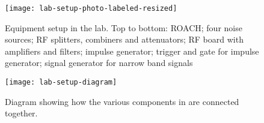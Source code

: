 \skiptoevenpage
\begin{figure}
  \centering
  \texttt{[image: lab-setup-photo-labeled-resized]}
  \caption{Equipment setup in the lab. Top to bottom: ROACH; four noise sources; RF splitters, combiners and attenuators; RF board with amplifiers and filters; impulse generator; trigger and gate for impulse generator; signal generator for narrow band signals}
  \label{fig:firmware:lab-setup-photo}
\end{figure}
\begin{figure}
  \centering
  \texttt{[image: lab-setup-diagram]}
  \caption{Diagram showing how the various components in  are connected together.}
  \label{fig:firmware-lab-setup-diagram}
\end{figure}

